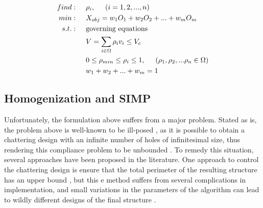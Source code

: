 \documentclass[../main.tex]{subfiles}
\begin{document}
\begin{align}
  find: & \hspace{0.5cm} \rho_i, \hspace{0.5cm} (i = 1, 2, ..., n)  \nonumber \\ 
  min:  & \hspace{0.5cm} X_{obj} = w_1 O_1 + w_2 O_2 + ... + w_m O_m  \nonumber \\ 
  s.t.: & \hspace{0.5cm} \text{governing equations}  \\ 
        & \hspace{0.5cm} V = \sum _{i \in \Omega} \rho_i v_i \leq V_c \nonumber \\ 
        & \hspace{0.5cm} 0 \leq \rho_{min} \leq \rho_i \leq 1, \hspace{0.5cm} (\rho_1, \rho_2, ... \rho_n \in \Omega) \nonumber \\
        & \hspace{0.5cm} w_1 + w_2 + ... + w_m = 1 \nonumber 
 \end{align}

\subsection{Homogenization and SIMP}
Unfortunately, the formulation above suffers from a major problem. Stated as is, the problem above is well-known to be ill-posed \cite{kohnOptimalDesignRelaxation1986}, as it is possible to obtain a chattering design with an infinite number of holes of infinitesimal size, thus rendering this compliance problem to be unbounded \cite{liuEfficient3DTopology2014}. To remedy this situation, several approaches have been proposed in the literature. One approach to control the chattering design is ensure that the total perimeter of the resulting structure has an upper bound \cite{haberNewApproachVariabletopology1996} \cite{jogTopologyDesignStructures2002}, but this e method suffers from several complications in implementation, and small variations in the parameters of the algorithm can lead to wildly different designs of the final structure \cite{jogTopologyDesignStructures2002}.
\end{document}
